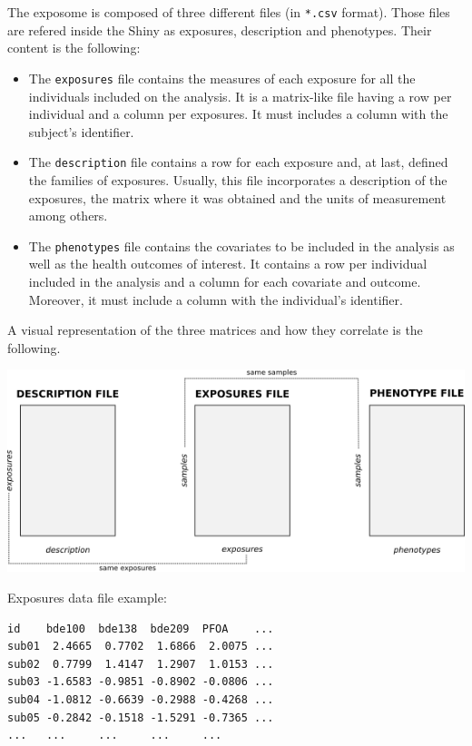 \documentclass[
]{book}
\providecommand{\tightlist}{%
  \setlength{\itemsep}{0pt}\setlength{\parskip}{0pt}}
\begin{document}
The exposome is composed of three different files (in \texttt{*.csv} format). Those files are refered inside the Shiny as exposures, description and phenotypes. Their content is the following:

\begin{itemize}
\tightlist
\item
  The \texttt{exposures} file contains the measures of each exposure for all the individuals included on the analysis. It is a matrix-like file having a row per individual and a column per exposures. It must includes a column with the subject's identifier.
\item
  The \texttt{description} file contains a row for each exposure and, at last, defined the families of exposures. Usually, this file incorporates a description of the exposures, the matrix where it was obtained and the units of measurement among others.
\item
  The \texttt{phenotypes} file contains the covariates to be included in the analysis as well as the health outcomes of interest. It contains a row per individual included in the analysis and a column for each covariate and outcome. Moreover, it must include a column with the individual's identifier.
\end{itemize}

A visual representation of the three matrices and how they correlate is the following.

\includegraphics{images/exposome_dataset_struct.png}

Exposures data file example:

\begin{verbatim}
id    bde100  bde138  bde209  PFOA    ...
sub01  2.4665  0.7702  1.6866  2.0075 ...
sub02  0.7799  1.4147  1.2907  1.0153 ...  
sub03 -1.6583 -0.9851 -0.8902 -0.0806 ... 
sub04 -1.0812 -0.6639 -0.2988 -0.4268 ... 
sub05 -0.2842 -0.1518 -1.5291 -0.7365 ... 
...   ...     ...     ...     ...
\end{verbatim}
\end{document}
